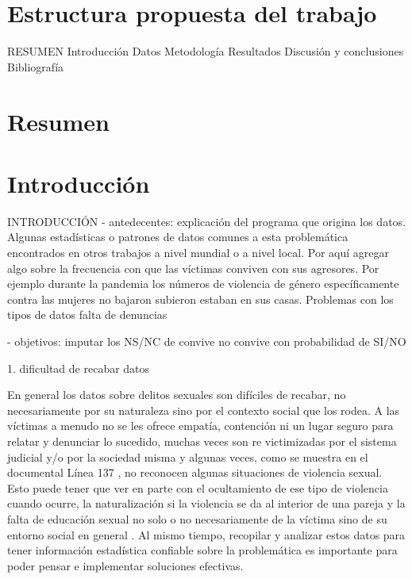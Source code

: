 \documentclass[10pt, spanish]{article}
\begin{document}
\newpage



\listoftodos

\newpage

\section*{Estructura propuesta del trabajo}




RESUMEN
Introducción
Datos
Metodología
Resultados
Discusión y conclusiones
Bibliografía

 

\newpage

\section*{Resumen}





\section{Introducción}\label{intro}

INTRODUCCIÓN 
- antedecentes: explicación del programa que origina los datos. Algunas estadísticas o patrones de datos comunes a esta problemática encontrados en otros trabajos a nivel mundial o a nivel local.
Por aquí agregar algo sobre la frecuencia con que las víctimas conviven con sus agresores. Por ejemplo durante la pandemia los números de violencia de género específicamente contra las mujeres no bajaron subieron estaban en sus casas.
Problemas con los tipos de datos falta de denuncias

- objetivos: imputar los NS/NC de convive no convive con probabilidad de SI/NO  

1. dificultad de recabar datos

En general los datos sobre delitos sexuales son difíciles de recabar, no necesariamente por su naturaleza sino por el contexto social que los rodea. A las víctimas a menudo no se les ofrece empatía, contención ni un lugar seguro para relatar y denunciar lo sucedido, muchas veces son re victimizadas por el sistema judicial y/o por la sociedad misma y algunas veces, como se muestra en el documental Línea 137 \cite{vasallo2020linea137}, no reconocen algunas situaciones de violencia sexual. Esto puede tener que ver en parte con el ocultamiento de ese tipo de violencia cuando ocurre, la naturalización si la violencia se da al interior de una pareja y la falta de educación sexual no solo o no necesariamente de la víctima sino de su entorno social en general \cite{contreras2016violencia}. Al mismo tiempo, recopilar y analizar estos datos para tener información estadística confiable sobre la problemática es importante para poder pensar e implementar soluciones efectivas.
\end{document}
